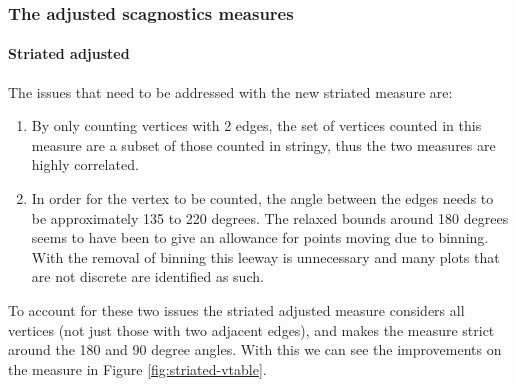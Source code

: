 \hypertarget{the-adjusted-scagnostics-measures}{%
\subsubsection{The adjusted scagnostics
measures}\label{the-adjusted-scagnostics-measures}}

\hypertarget{striated-adjusted}{%
\paragraph{Striated adjusted}\label{striated-adjusted}}

The issues that need to be addressed with the new striated measure are:

\begin{enumerate}
\def\labelenumi{\arabic{enumi}.}
\tightlist
\item
  By only counting vertices with 2 edges, the set of vertices counted in
  this measure are a subset of those counted in stringy, thus the two
  measures are highly correlated.
\item
  In order for the vertex to be counted, the angle between the edges
  needs to be approximately 135 to 220 degrees. The relaxed bounds
  around 180 degrees seems to have been to give an allowance for points
  moving due to binning. With the removal of binning this leeway is
  unnecessary and many plots that are not discrete are identified as
  such.
\end{enumerate}

To account for these two issues the striated adjusted measure considers
all vertices (not just those with two adjacent edges), and makes the
measure strict around the 180 and 90 degree angles. With this we can see
the improvements on the measure in Figure \ref{fig:striated-vtable}.

